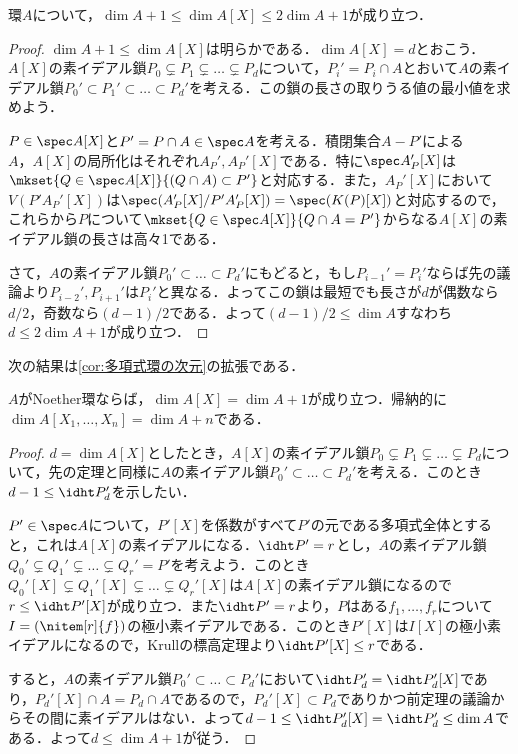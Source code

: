 \begin{thm}
	環$A$について，$\dim A+1\leq\dim A[X]\leq 2\dim A+1$が成り立つ．
\end{thm}

\begin{proof}
	$\dim A+1\leq\dim A[X]$は明らかである．$\dim A[X]=d$とおこう．$A[X]$の素イデアル鎖$P_0\subsetneq P_1\subsetneq\dots\subsetneq P_d$について，$P_i'=P_i\cap A$とおいて$A$の素イデアル鎖$P_0'\subset P_1'\subset\dots\subset P_d'$を考える．この鎖の長さの取りうる値の最小値を求めよう．
	
	$P\in\spec A[X]$と$P'=P\cap A\in\spec A$を考える．積閉集合$A-P'$による$A，A[X]$の局所化はそれぞれ$A_P',A_P'[X]$である．特に$\spec A_P'[X]$は$\mkset{Q\in\spec A[X]}{(Q\cap A)\subset P'}$と対応する．また，$A_P'[X]$において$V(P'A_P'[X])$は$\spec (A_P'[X]/P'A_P'[X])=\spec (K(P)[X])$と対応するので，これらから$P$について$\mkset{Q\in\spec A[X]}{Q\cap A=P'}$からなる$A[X]$の素イデアル鎖の長さは高々1である．
	
	さて，$A$の素イデアル鎖$P_0'\subset\dots\subset P_d'$にもどると，もし$P_{i-1}'=P_i'$ならば先の議論より$P_{i-2}',P_{i+1}'$は$P_i'$と異なる．よってこの鎖は最短でも長さが$d$が偶数なら$d/2$，奇数なら$(d-1)/2$である．よって$(d-1)/2\leq \dim A$すなわち$d\leq 2\dim A+1$が成り立つ．
\end{proof}

次の結果は\ref{cor:多項式環の次元}の拡張である．

\begin{cor}\label{cor:Noether多項式の次元}
	$A$がNoether環ならば，$\dim A[X]=\dim A+1$が成り立つ．帰納的に$\dim A[X_1,\dots,X_n]=\dim A+n$である．
\end{cor}

\begin{proof}
	$d=\dim A[X]$としたとき，$A[X]$の素イデアル鎖$P_0\subsetneq P_1\subsetneq\dots\subsetneq P_d$について，先の定理と同様に$A$の素イデアル鎖$P_0'\subset\dots\subset P_d'$を考える．このとき$d-1\leq\idht P_d'$を示したい．
	
	$P'\in\spec A$について，$P'[X]$を係数がすべて$P'$の元である多項式全体とすると，これは$A[X]$の素イデアルになる．$\idht P'=r$とし，$A$の素イデアル鎖$Q_0'\subsetneq Q_1'\subsetneq\dots\subsetneq Q_r'=P'$を考えよう．このとき$Q_0'[X]\subsetneq Q_1'[X]\subsetneq\dots\subsetneq Q_r'[X]$は$A[X]$の素イデアル鎖になるので$r\leq\idht P'[X]$が成り立つ．また$\idht P'=r$より，$P$はある$f_1,\dots,f_r$について$I=(\nitem[r]{f})$の極小素イデアルである．このとき$P'[X]$は$I[X]$の極小素イデアルになるので，Krullの標高定理より$\idht P'[X]\leq r$である．
	
	すると，$A$の素イデアル鎖$P_0'\subset\dots\subset P_d'$において$\idht P_d'=\idht P_d'[X]$であり，$P_d'[X]\cap A=P_d\cap A$であるので，$P_d'[X]\subset P_d$でありかつ前定理の議論からその間に素イデアルはない．よって$d-1\leq\idht P_d'[X]=\idht P_d'\leq\dim A$である．よって$d\leq\dim A+1$が従う．
\end{proof}

